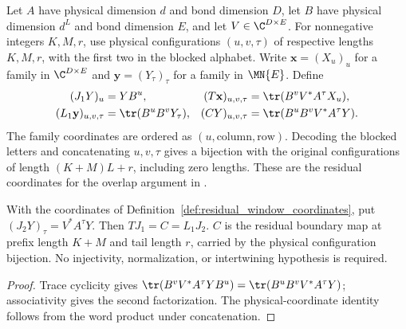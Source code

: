 \begin{definition}
    \label{def:residual_window_coordinates}
    \leanok
    Let $A$ have physical dimension $d$ and bond dimension $D$, let $B$ have
    physical dimension $d^L$ and bond dimension $E$, and let $V\in\C^{D\times E}$.
    For nonnegative integers $K,M,r$, use physical configurations $(u,v,\tau)$
    of respective lengths $K,M,r$, with the first two in the blocked alphabet.
    Write $\mathbf x=(X_u)_u$ for a family in $\C^{D\times E}$ and
    $\mathbf y=(Y_\tau)_\tau$ for a family in $\MN{E}$. Define
    \begin{align}
        (J_1Y)_u                  & =YB^u,                           &
        (T\mathbf x)_{u,v,\tau}   & =\tr(B^vV^*A^\tau X_u),\nonumber   \\
        (L_1\mathbf y)_{u,v,\tau} & =\tr(B^uB^vY_\tau),              &
        (CY)_{u,v,\tau}           & =\tr(B^uB^vV^*A^\tau Y).
        \label{eq:ph_residual_window_maps}
    \end{align}
    The family coordinates are ordered as $(u,\text{column},\text{row})$.
    Decoding the blocked letters and concatenating $u,v,\tau$ gives a bijection
    with the original configurations of length $(K+M)L+r$, including zero lengths.
    These are the residual coordinates for the overlap argument in
    \cite[Lemma~6.1(ii)]{Nachtergaele1996Spectral}.
\end{definition}

\begin{lemma}
    \label{thm:residual_window_factorizations}
    \leanok
    With the coordinates of Definition~\ref{def:residual_window_coordinates},
    put $(J_2Y)_\tau=V^*A^\tau Y$. Then $TJ_1=C=L_1J_2$.
    $C$ is the residual boundary map at prefix length $K+M$ and tail
    length $r$, carried by the physical configuration bijection.
    No injectivity, normalization, or intertwining hypothesis is required.
\end{lemma}
\begin{proof}\leanok
    Trace cyclicity gives
    $\tr(B^vV^*A^\tau YB^u)=\tr(B^uB^vV^*A^\tau Y)$;
    associativity gives the second factorization.
    The physical-coordinate identity follows from the word product under
    concatenation.
\end{proof}


